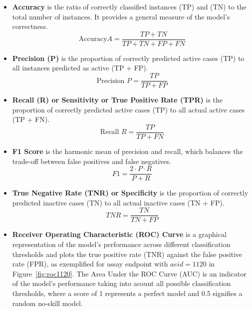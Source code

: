 \begin{itemize}
  \item \textbf{Accuracy} is the ratio of correctly classified instances (TP) and (TN) to the total number of instances. It provides a general measure of the model's correctness.
  \[ \text{Accuracy}  A = \frac{TP + TN}{TP + TN + FP + FN} \]

  \item \textbf{Precision (P)} is the proportion of correctly predicted active cases (TP) to all instances predicted as active (TP + FP). 
  \[ \text{Precision } P = \frac{TP}{TP + FP} \]

  \item \textbf{Recall (R) or Sensitivity or True Positive Rate (TPR)} is the proportion of correctly predicted active cases (TP) to all actual active cases (TP + FN).
  \[ \text{Recall } R = \frac{TP}{TP + FN} \]

  \item \textbf{F1 Score} is the harmonic mean of precision and recall, which balances the trade-off between false positives and false negatives.
  \[ F1 = \frac{2 \cdot P \cdot R}{P + R} \]

  \item \textbf{True Negative Rate (TNR) or Specificity} is the proportion of correctly predicted inactive cases (TN) to all actual inactive cases (TN + FP).
  \[ TNR = \frac{TN}{TN + FP} \]

  \item \textbf{Receiver Operating Characteristic (ROC) Curve} is a graphical representation of the model's performance across different classification thresholds and plots the true positive rate (TNR) against the false positive rate (FPR), as exemplified for assay endpoint with $aeid=1120$ in Figure~\ref{fig:roc1120}. The Area Under the ROC Curve (AUC) is an indicator of the model's performance taking into acount all possible classification thresholds, where a score of 1 represents a perfect model and 0.5 signifies a random no-skill model. 


\end{itemize}

